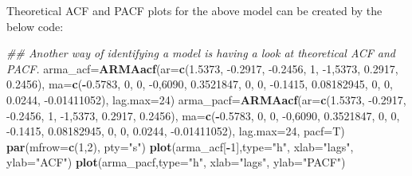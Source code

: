 \documentclass[
]{article}
\newenvironment{Shaded}{\begin{snugshade}}{\end{snugshade}}
\newcommand{\CommentTok}[1]{\textcolor[rgb]{0.56,0.35,0.01}{\textit{#1}}}
\newcommand{\DataTypeTok}[1]{\textcolor[rgb]{0.13,0.29,0.53}{#1}}
\newcommand{\DecValTok}[1]{\textcolor[rgb]{0.00,0.00,0.81}{#1}}
\newcommand{\FloatTok}[1]{\textcolor[rgb]{0.00,0.00,0.81}{#1}}
\newcommand{\KeywordTok}[1]{\textcolor[rgb]{0.13,0.29,0.53}{\textbf{#1}}}
\newcommand{\NormalTok}[1]{#1}
\newcommand{\OperatorTok}[1]{\textcolor[rgb]{0.81,0.36,0.00}{\textbf{#1}}}
\newcommand{\StringTok}[1]{\textcolor[rgb]{0.31,0.60,0.02}{#1}}
\begin{document}
Theoretical ACF and PACF plots for the above model can be created by the
below code:

\begin{Shaded}
\begin{Highlighting}[]
\CommentTok{## Another way of identifying a model is having a look at theoretical ACF and PACF.}
\NormalTok{arma_acf=}\KeywordTok{ARMAacf}\NormalTok{(}\DataTypeTok{ar=}\KeywordTok{c}\NormalTok{(}\FloatTok{1.5373}\NormalTok{, }\FloatTok{-0.2917}\NormalTok{, }\FloatTok{-0.2456}\NormalTok{, }\DecValTok{1}\NormalTok{, }\DecValTok{-1}\NormalTok{,}\DecValTok{5373}\NormalTok{, }\FloatTok{0.2917}\NormalTok{, }\FloatTok{0.2456}\NormalTok{), }\DataTypeTok{ma=}\KeywordTok{c}\NormalTok{(}\OperatorTok{-}\FloatTok{0.5783}\NormalTok{, }\DecValTok{0}\NormalTok{, }\DecValTok{0}\NormalTok{, }\DecValTok{-0}\NormalTok{,}\DecValTok{6090}\NormalTok{, }\FloatTok{0.3521847}\NormalTok{, }\DecValTok{0}\NormalTok{, }\DecValTok{0}\NormalTok{, }\FloatTok{-0.1415}\NormalTok{, }\FloatTok{0.08182945}\NormalTok{, }\DecValTok{0}\NormalTok{, }\DecValTok{0}\NormalTok{, }\FloatTok{0.0244}\NormalTok{, }\FloatTok{-0.01411052}\NormalTok{), }\DataTypeTok{lag.max=}\DecValTok{24}\NormalTok{)}
\NormalTok{arma_pacf=}\KeywordTok{ARMAacf}\NormalTok{(}\DataTypeTok{ar=}\KeywordTok{c}\NormalTok{(}\FloatTok{1.5373}\NormalTok{, }\FloatTok{-0.2917}\NormalTok{, }\FloatTok{-0.2456}\NormalTok{, }\DecValTok{1}\NormalTok{, }\DecValTok{-1}\NormalTok{,}\DecValTok{5373}\NormalTok{, }\FloatTok{0.2917}\NormalTok{, }\FloatTok{0.2456}\NormalTok{), }\DataTypeTok{ma=}\KeywordTok{c}\NormalTok{(}\OperatorTok{-}\FloatTok{0.5783}\NormalTok{, }\DecValTok{0}\NormalTok{, }\DecValTok{0}\NormalTok{, }\DecValTok{-0}\NormalTok{,}\DecValTok{6090}\NormalTok{, }\FloatTok{0.3521847}\NormalTok{, }\DecValTok{0}\NormalTok{, }\DecValTok{0}\NormalTok{, }\FloatTok{-0.1415}\NormalTok{, }\FloatTok{0.08182945}\NormalTok{, }\DecValTok{0}\NormalTok{, }\DecValTok{0}\NormalTok{, }\FloatTok{0.0244}\NormalTok{, }\FloatTok{-0.01411052}\NormalTok{), }\DataTypeTok{lag.max=}\DecValTok{24}\NormalTok{, }\DataTypeTok{pacf=}\NormalTok{T)}
\KeywordTok{par}\NormalTok{(}\DataTypeTok{mfrow=}\KeywordTok{c}\NormalTok{(}\DecValTok{1}\NormalTok{,}\DecValTok{2}\NormalTok{), }\DataTypeTok{pty=}\StringTok{"s"}\NormalTok{)}
\KeywordTok{plot}\NormalTok{(arma_acf[}\OperatorTok{-}\DecValTok{1}\NormalTok{],}\DataTypeTok{type=}\StringTok{"h"}\NormalTok{, }\DataTypeTok{xlab=}\StringTok{"lags"}\NormalTok{, }\DataTypeTok{ylab=}\StringTok{"ACF"}\NormalTok{)}
\KeywordTok{plot}\NormalTok{(arma_pacf,}\DataTypeTok{type=}\StringTok{"h"}\NormalTok{, }\DataTypeTok{xlab=}\StringTok{"lags"}\NormalTok{, }\DataTypeTok{ylab=}\StringTok{"PACF"}\NormalTok{) }
\end{Highlighting}
\end{Shaded}
\end{document}
